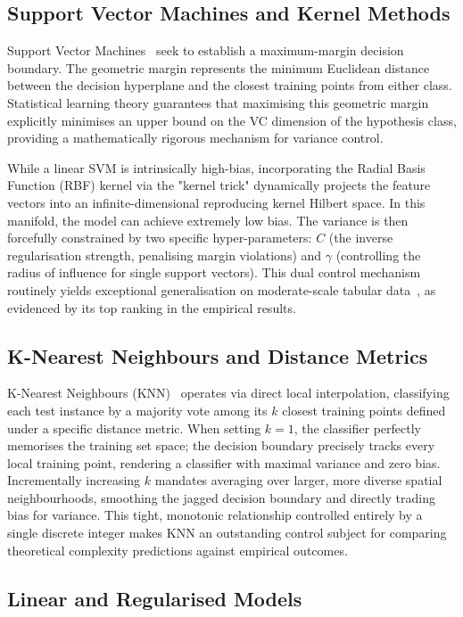 \documentclass[conference]{IEEEtran}
\begin{document}
\subsection{Support Vector Machines and Kernel Methods}

Support Vector Machines~\cite{b10} seek to establish a maximum-margin decision boundary. The geometric margin represents the minimum Euclidean distance between the decision hyperplane and the closest training points from either class. Statistical learning theory guarantees that maximising this geometric margin explicitly minimises an upper bound on the VC dimension of the hypothesis class, providing a mathematically rigorous mechanism for variance control. 

While a linear SVM is intrinsically high-bias, incorporating the Radial Basis Function (RBF) kernel via the "kernel trick" dynamically projects the feature vectors into an infinite-dimensional reproducing kernel Hilbert space. In this manifold, the model can achieve extremely low bias. The variance is then forcefully constrained by two specific hyper-parameters: $C$ (the inverse regularisation strength, penalising margin violations) and $\gamma$ (controlling the radius of influence for single support vectors). This dual control mechanism routinely yields exceptional generalisation on moderate-scale tabular data~\cite{b24}, as evidenced by its top ranking in the empirical results.

\subsection{K-Nearest Neighbours and Distance Metrics}

K-Nearest Neighbours (KNN)~\cite{b11, b20} operates via direct local interpolation, classifying each test instance by a majority vote among its $k$ closest training points defined under a specific distance metric. When setting $k=1$, the classifier perfectly memorises the training set space; the decision boundary precisely tracks every local training point, rendering a classifier with maximal variance and zero bias. Incrementally increasing $k$ mandates averaging over larger, more diverse spatial neighbourhoods, smoothing the jagged decision boundary and directly trading bias for variance. This tight, monotonic relationship controlled entirely by a single discrete integer makes KNN an outstanding control subject for comparing theoretical complexity predictions against empirical outcomes.

\subsection{Linear and Regularised Models}
\end{document}
